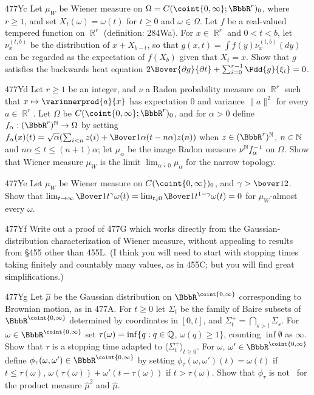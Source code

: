 {\spheader 477Yc Let $\mu_W$ be Wiener measure on
$\Omega=C(\coint{0,\infty};\BbbR^r)_0$, where $r\ge 1$,
and set $X_t(\omega)=\omega(t)$ for $t\ge 0$ and $\omega\in\Omega$.
Let $f$ be a real-valued tempered function on $\BbbR^r$ (definition:
284Wa).   For $x\in\BbbR^r$ and $0<t<b$, let
$\nu_x^{(t,b)}$ be the distribution of $x+X_{b-t}$, so that
$g(x,t)=\int f(y)\nu_x^{(t,b)}(dy)$ can be regarded as
the expectation of $f(X_b)$ given that $X_t=x$.   Show that
$g$ satisfies the backwards heat equation
$2\Bover{\partial g}{\partial t}+\sum_{i=0}^{r-1}\Pdd{g}{\xi_i}=0$.

\spheader 477Yd Let $r\ge 1$ be an integer,
and $\nu$ a Radon probability measure on $\BbbR^r$ such that
$x\mapsto\varinnerprod{a}{x}$ has expectation $0$ and variance
$\|a\|^2$ for every $a\in\BbbR^r$.
Let $\Omega$ be $C(\coint{0,\infty};\BbbR^r)_0$, and
for $\alpha>0$ define $f_{\alpha}:(\BbbR^r)^{\Bbb N}\to\Omega$ by setting
$f_{\alpha}(x)(t)
=\sqrt{\alpha}(\sum_{i<n}z(i)+\Bover1{\alpha}(t-n\alpha)z(n))$ when
$z\in(\BbbR^r)^{\Bbb N}$, $n\in\Bbb N$ and $n\alpha\le t\le(n+1)\alpha$;
let $\mu_{\alpha}$ be the image Radon measure $\nu^{\Bbb N}f_{\alpha}^{-1}$
on $\Omega$.   Show that Wiener measure $\mu_W$ is the limit
$\lim_{\alpha\downarrow 0}\mu_{\alpha}$ for the narrow topology.

\spheader 477Ye Let $\mu_W$ be Wiener measure on $C(\coint{0,\infty})_0$,
and $\gamma>\bover12$.   Show that
$\lim_{t\to\infty}\Bover1{t^{\gamma}}\omega(t)
=\lim_{t\downarrow 0}\Bover1{t^{1-\gamma}}\omega(t)=0$
for $\mu_W$-almost every $\omega$.


\spheader 477Yf Write out a proof of 477G which works directly from the
Gaussian-distribution
characterization of Wiener measure, without appealing to results from
\S455 other than 455L.   (I think you will need to start with stopping
times taking finitely and countably many values, as in 455C;  but
you will find great simplifications.)

\spheader 477Yg Let $\hat\mu$ be the Gaussian distribution on
$\BbbR^{\coint{0,\infty}}$ corresponding to Brownian motion, as in
477A.   For $t\ge 0$ let
$\Sigma_t$ be the family of Baire subsets of $\BbbR^{\coint{0,\infty}}$
determined by coordinates in $[0,t]$, and
$\Sigma^+_t=\bigcap_{s>t}\Sigma_s$.
For $\omega\in\BbbR^{\coint{0,\infty}}$ set
$\tau(\omega)=\inf\{q:q\in\Bbb Q$, $\omega(q)\ge 1\}$, counting
$\inf\emptyset$ as $\infty$.   Show that $\tau$ is a stopping time adapted
to $\langle\Sigma^+_t\rangle_{t\ge 0}$.
For $\omega$, $\omega'\in\BbbR^{\coint{0,\infty}}$
define $\phi_{\tau}(\omega,\omega')\in\BbbR^{\coint{0,\infty}}$ by setting
$\phi_{\tau}(\omega,\omega')(t)=\omega(t)$ if $t\le\tau(\omega)$,
$\omega(\tau(\omega))+\omega'(t-\tau(\omega))$ if $t>\tau(\omega)$.
Show that $\phi_{\tau}$ is not \imp\ for the product measure
$\hat\mu^2$ and $\hat\mu$.    

}
